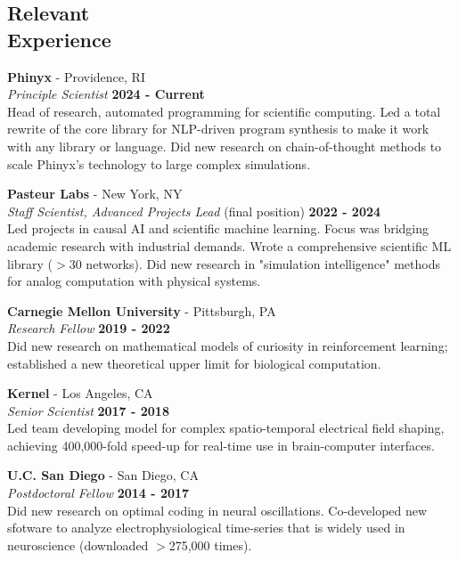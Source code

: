 \documentclass[margin,line]{res}
\begin{document}
\begin{resume}
\section{\sc Relevant\\Experience}
{\bf Phinyx} - Providence, RI\\
{\em Principle Scientist} \hfill {\bf 2024 - Current}\\
Head of research, automated programming for scientific computing. Led a total rewrite of the core library for NLP-driven program synthesis to make it work with any library or language. Did new research on chain-of-thought methods to scale Phinyx's technology to large complex simulations. 

\vspace{-.25cm}
{\bf Pasteur Labs} - New York, NY\\
{\em Staff Scientist, Advanced Projects Lead} (final position) \hfill {\bf 2022 - 2024}\\
Led projects in causal AI and scientific machine learning. Focus was bridging academic research with industrial demands. Wrote a comprehensive scientific ML library ($>$30 networks). Did new research in  "simulation intelligence" methods for analog computation with physical systems.


\vspace{-.25cm}
{\bf Carnegie Mellon University} - Pittsburgh, PA\\
{\em Research Fellow} \hfill {\bf 2019 - 2022}\\
Did new research on mathematical models of curiosity in reinforcement learning; established a new theoretical upper limit for biological computation.

\vspace{-.25cm}
{\bf Kernel} - Los Angeles, CA\\
{\em Senior Scientist} \hfill {\bf 2017 - 2018}\\
Led team developing model for complex spatio-temporal electrical field shaping, achieving 400,000-fold speed-up for real-time use in brain-computer interfaces.

\vspace{-.25cm}
{\bf U.C. San Diego} - San Diego, CA\\
{\em Postdoctoral Fellow} \hfill {\bf 2014 - 2017}\\
Did new research on optimal coding in neural oscillations. Co-developed new sfotware to analyze electrophysiological time-series that is widely used in neuroscience (downloaded $>$275,000 times).


\end{resume}
\end{document}
